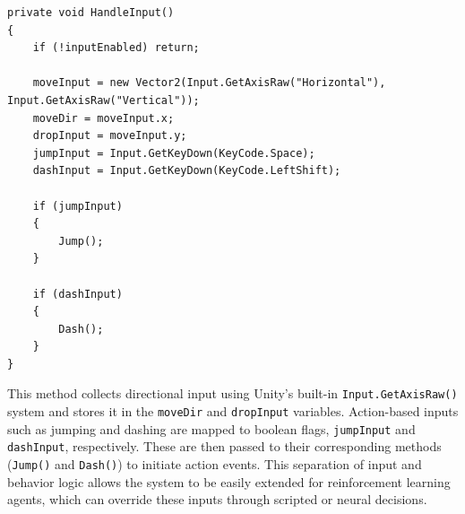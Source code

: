 \documentclass[12pt,oneside,openright,a4paper]{cpe-english-project}
\begin{document}
\begin{lstlisting}[language={[Sharp]C}]
private void HandleInput()
{
	if (!inputEnabled) return;

	moveInput = new Vector2(Input.GetAxisRaw("Horizontal"), Input.GetAxisRaw("Vertical"));
	moveDir = moveInput.x;
	dropInput = moveInput.y;
	jumpInput = Input.GetKeyDown(KeyCode.Space);
	dashInput = Input.GetKeyDown(KeyCode.LeftShift);

	if (jumpInput)
	{
		Jump();
	}
	
	if (dashInput)
	{
		Dash();
	}
}
\end{lstlisting}
This method collects directional input using Unity's built-in \texttt{Input.GetAxisRaw()} system and stores it in the \texttt{moveDir} and \texttt{dropInput} variables. Action-based inputs such as jumping and dashing are mapped to boolean flags, \texttt{jumpInput} and \texttt{dashInput}, respectively. These are then passed to their corresponding methods (\texttt{Jump()} and \texttt{Dash()}) to initiate action events. This separation of input and behavior logic allows the system to be easily extended for reinforcement learning agents, which can override these inputs through scripted or neural decisions.
\end{document}
